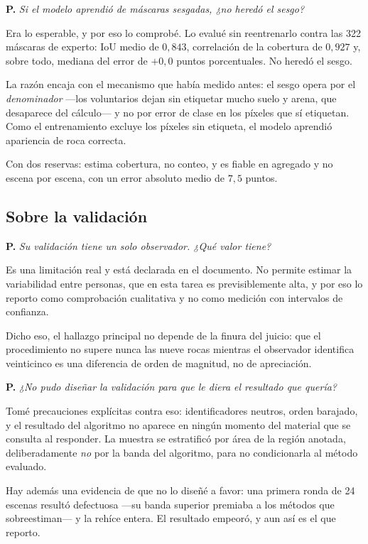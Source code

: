 \documentclass[11pt]{article}
\newcommand{\pregunta}[1]{\medskip\noindent\textbf{\color{rojo}P.}\; \textit{#1}\par}
\begin{document}
\pregunta{Si el modelo aprendió de máscaras sesgadas, ¿no heredó el sesgo?}
\begin{resp}
Era lo esperable, y por eso lo comprobé. Lo evalué sin reentrenarlo contra las \num{322}
máscaras de experto: IoU medio de $0{,}843$, correlación de la cobertura de $0{,}927$ y,
sobre todo, mediana del error de $+0{,}0$ puntos porcentuales. No heredó el sesgo.

La razón encaja con el mecanismo que había medido antes: el sesgo opera por el
\emph{denominador} —los voluntarios dejan sin etiquetar mucho suelo y arena, que desaparece
del cálculo— y no por error de clase en los píxeles que sí etiquetan. Como el entrenamiento
excluye los píxeles sin etiqueta, el modelo aprendió apariencia de roca correcta.

Con dos reservas: estima cobertura, no conteo, y es fiable en agregado y no escena por
escena, con un error absoluto medio de $7{,}5$ puntos.
\end{resp}

\subsection*{Sobre la validación}

\pregunta{Su validación tiene un solo observador. ¿Qué valor tiene?}
\begin{resp}
Es una limitación real y está declarada en el documento. No permite estimar la variabilidad
entre personas, que en esta tarea es previsiblemente alta, y por eso lo reporto como
comprobación cualitativa y no como medición con intervalos de confianza.

Dicho eso, el hallazgo principal no depende de la finura del juicio: que el procedimiento
no supere nunca las nueve rocas mientras el observador identifica veinticinco es una
diferencia de orden de magnitud, no de apreciación.
\end{resp}

\pregunta{¿No pudo diseñar la validación para que le diera el resultado que quería?}
\begin{resp}
Tomé precauciones explícitas contra eso: identificadores neutros, orden barajado, y el
resultado del algoritmo no aparece en ningún momento del material que se consulta al
responder. La muestra se estratificó por área de la región anotada, deliberadamente
\emph{no} por la banda del algoritmo, para no condicionarla al método evaluado.

Hay además una evidencia de que no lo diseñé a favor: una primera ronda de \num{24}
escenas resultó defectuosa —su banda superior premiaba a los métodos que sobreestiman— y la
rehíce entera. El resultado empeoró, y aun así es el que reporto.
\end{resp}
\end{document}
